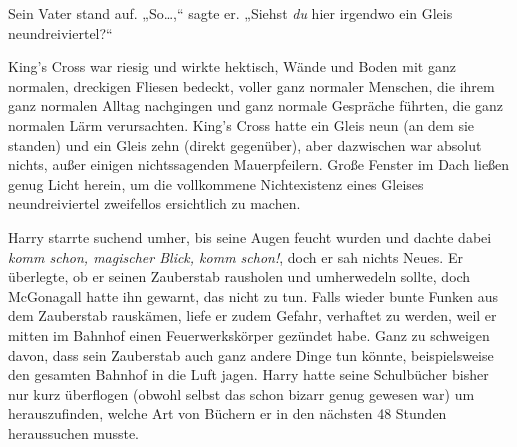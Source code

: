 Sein Vater stand auf. „So…,“ sagte er. „Siehst \emph{du} hier irgendwo ein Gleis neundreiviertel?“

King's Cross war riesig und wirkte hektisch, Wände und Boden mit ganz normalen, dreckigen Fliesen bedeckt, voller ganz normaler Menschen, die ihrem ganz normalen Alltag nachgingen und ganz normale Gespräche führten, die ganz normalen Lärm verursachten. King's Cross hatte ein Gleis neun (an dem sie standen) und ein Gleis zehn (direkt gegenüber), aber dazwischen war absolut nichts, außer einigen nichtssagenden Mauerpfeilern. Große Fenster im Dach ließen genug Licht herein, um die vollkommene Nichtexistenz eines Gleises neundreiviertel zweifellos ersichtlich zu machen.

Harry starrte suchend umher, bis seine Augen feucht wurden und dachte dabei \emph{komm schon, magischer Blick, komm schon!}, doch er sah nichts Neues. Er überlegte, ob er seinen Zauberstab rausholen und umherwedeln sollte, doch McGonagall hatte ihn gewarnt, das nicht zu tun. Falls wieder bunte Funken aus dem Zauberstab rauskämen, liefe er zudem Gefahr, verhaftet zu werden, weil er mitten im Bahnhof einen Feuerwerkskörper gezündet habe. Ganz zu schweigen davon, dass sein Zauberstab auch ganz andere Dinge tun könnte, beispielsweise den gesamten Bahnhof in die Luft jagen. Harry hatte seine Schulbücher bisher nur kurz überflogen (obwohl selbst das schon bizarr genug gewesen war) um herauszufinden, welche Art von Büchern er in den nächsten 48 Stunden heraussuchen musste.

